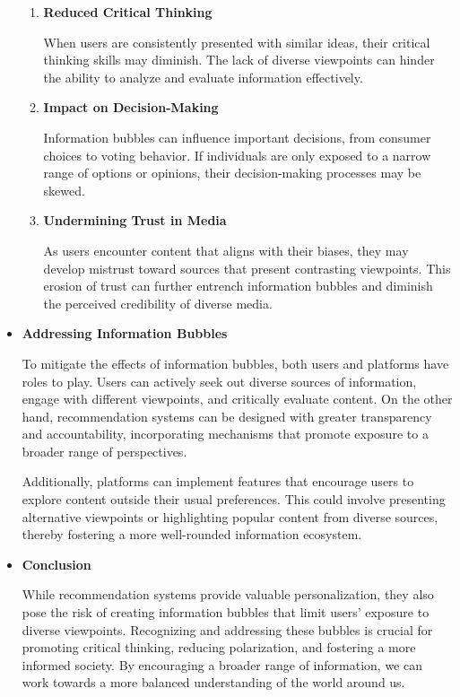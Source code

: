 \documentclass[10pt,twoside,slovak,a4paper]{article}
\begin{document}
\begin{itemize}
\begin{enumerate}
\item \textbf{Reduced Critical Thinking}

When users are consistently presented with similar ideas, their critical thinking skills may diminish\cite{sssr}. The lack of diverse viewpoints can hinder the ability to analyze and evaluate information effectively.


\item \textbf{Impact on Decision-Making}

Information bubbles can influence important decisions, from consumer choices to voting behavior\cite{politics}. If individuals are only exposed to a narrow range of options or opinions, their decision-making processes may be skewed.

\item \textbf{Undermining Trust in Media}

As users encounter content that aligns with their biases, they may develop mistrust toward sources that present contrasting viewpoints\cite{boubble}. This erosion of trust can further entrench information bubbles and diminish the perceived credibility of diverse media.
\end{enumerate}
\item \textbf{Addressing Information Bubbles} 

To mitigate the effects of information bubbles, both users and platforms have roles to play. Users can actively seek out diverse sources of information, engage with different viewpoints, and critically evaluate content. On the other hand, recommendation systems can be designed with greater transparency and accountability, incorporating mechanisms that promote exposure to a broader range of perspectives\cite{youtube}.

Additionally, platforms can implement features that encourage users to explore content outside their usual preferences\cite{youtube}. This could involve presenting alternative viewpoints or highlighting popular content from diverse sources, thereby fostering a more well-rounded information ecosystem.

\item \textbf{Conclusion} 

While recommendation systems provide valuable personalization, they also pose the risk of creating information bubbles that limit users' exposure to diverse viewpoints. Recognizing and addressing these bubbles is crucial for promoting critical thinking, reducing polarization, and fostering a more informed society. By encouraging a broader range of information, we can work towards a more balanced understanding of the world around us.
\end{itemize}
\end{document}
